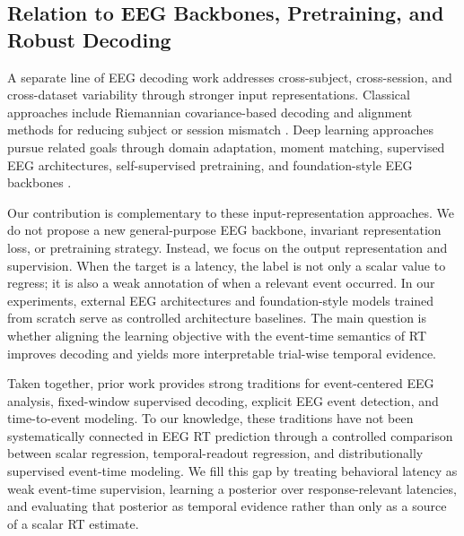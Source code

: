 \subsection{Relation to EEG Backbones, Pretraining, and Robust Decoding}

A separate line of EEG decoding work addresses cross-subject, cross-session, and cross-dataset variability through stronger input representations. Classical approaches include Riemannian covariance-based decoding and alignment methods for reducing subject or session mismatch \citep{Barachant2012,Jayaram2016,Zanini2018,HeWu2020}. Deep learning approaches pursue related goals through domain adaptation, moment matching, supervised EEG architectures, self-supervised pretraining, and foundation-style EEG backbones \citep{Ganin2016,Sun2016,Kostas2021,Wang2024,Jiang2024,Chen2024,Wang2025,Ouahidi2025,Yue2025}.

Our contribution is complementary to these input-representation approaches. We do not propose a new general-purpose EEG backbone, invariant representation loss, or pretraining strategy. Instead, we focus on the output representation and supervision. When the target is a latency, the label is not only a scalar value to regress; it is also a weak annotation of when a relevant event occurred. In our experiments, external EEG architectures and foundation-style models trained from scratch serve as controlled architecture baselines. The main question is whether aligning the learning objective with the event-time semantics of RT improves decoding and yields more interpretable trial-wise temporal evidence.

Taken together, prior work provides strong traditions for event-centered EEG analysis, fixed-window supervised decoding, explicit EEG event detection, and time-to-event modeling. To our knowledge, these traditions have not been systematically connected in EEG RT prediction through a controlled comparison between scalar regression, temporal-readout regression, and distributionally supervised event-time modeling. We fill this gap by treating behavioral latency as weak event-time supervision, learning a posterior over response-relevant latencies, and evaluating that posterior as temporal evidence rather than only as a source of a scalar RT estimate.
